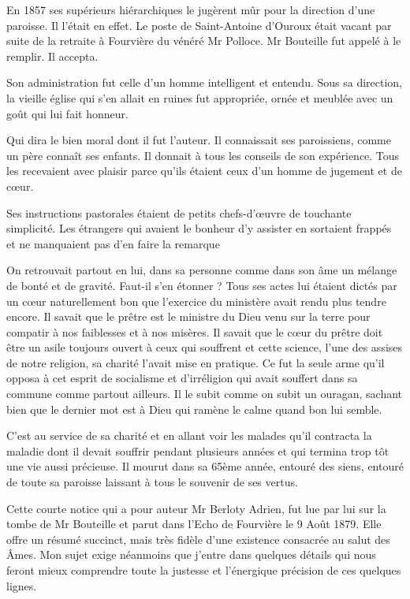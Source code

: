 En 1857 ses supérieurs hiérarchiques le jugèrent mûr pour la direction d'une paroisse. Il l'était en effet. Le poste de Saint-Antoine d'Ouroux était vacant par suite de la retraite à Fourvière du vénéré Mr Polloce. Mr Bouteille fut appelé à le remplir. Il accepta.

Son administration fut celle d'un homme intelligent et entendu. Sous sa direction, la vieille église qui s'en allait en ruines fut appropriée, ornée et meublée avec un goût qui lui fait honneur.

Qui dira le bien moral dont il fut l'auteur. Il connaissait ses paroissiens, comme un père connaît ses enfants. Il donnait à tous les conseils de son expérience. Tous les recevaient avec plaisir parce qu'ils étaient ceux d'un homme de jugement et de cœur.

Ses instructions pastorales étaient de petits chefs-d'œuvre de touchante simplicité. Les étrangers qui avaient le bonheur d'y assister en sortaient frappés et ne manquaient pas d'en faire la remarque

On retrouvait partout en lui, dans sa personne comme dans son âme un mélange de bonté et de gravité. Faut-il s'en étonner ? Tous ses actes lui étaient dictés par un cœur naturellement bon que l'exercice du ministère avait rendu plus tendre encore. Il savait que le prêtre est le ministre du Dieu venu sur la terre pour compatir à nos faiblesses et à nos misères. Il savait que le cœur du prêtre doit être un asile toujours ouvert à ceux qui souffrent et cette science, l'une des assises de notre religion, sa charité l'avait mise en pratique. Ce fut la seule arme qu'il opposa à cet esprit de socialisme et d'irréligion
qui avait souffert dans sa commune comme partout ailleurs. Il le subit comme on subit un ouragan, sachant bien que le dernier mot est à Dieu qui ramène le calme quand bon lui semble.

C'est au service de sa charité et en allant voir les malades qu'il contracta la maladie dont il devait souffrir pendant plusieurs années et qui termina trop tôt une vie aussi précieuse. Il mourut dans sa 65ème année, entouré des siens, entouré de toute sa paroisse laissant à tous le souvenir de ses vertus.

Cette courte notice qui a pour auteur Mr Berloty Adrien, fut lue par lui sur la tombe de Mr Bouteille et parut dans l'Echo de Fourvière le 9 Août 1879. Elle offre un résumé succinct, mais très fidèle d'une existence consacrée au salut des Âmes. Mon sujet exige néanmoins que j'entre dans quelques détails qui nous feront mieux comprendre toute la justesse et l'énergique précision de ces quelques lignes.

